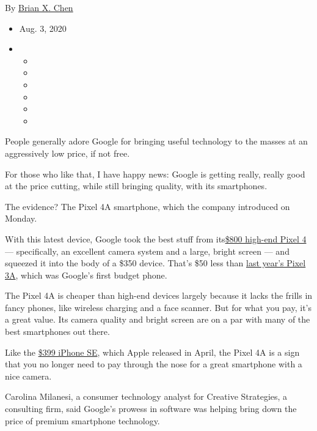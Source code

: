 By \href{https://www.nytimes.com/by/brian-x-chen}{Brian X. Chen}

\begin{itemize}
\item
  Aug. 3, 2020
\item
  \begin{itemize}
  \item
  \item
  \item
  \item
  \item
  \item
  \end{itemize}
\end{itemize}

People generally adore Google for bringing useful technology to the
masses at an aggressively low price, if not free.

For those who like that, I have happy news: Google is getting really,
really good at the price cutting, while still bringing quality, with its
smartphones.

The evidence? The Pixel 4A smartphone, which the company introduced on
Monday.

With this latest device, Google took the best stuff from
its\href{https://www.nytimes.com/2019/10/21/technology/personaltech/pixel-4-review.html}{\$800
high-end Pixel 4} --- specifically, an excellent camera system and a
large, bright screen --- and squeezed it into the body of a \$350
device. That's \$50 less than
\href{https://www.nytimes.com/2019/05/07/technology/personaltech/pixel-3a.html}{last
year's Pixel 3A}, which was Google's first budget phone.

The Pixel 4A is cheaper than high-end devices largely because it lacks
the frills in fancy phones, like wireless charging and a face scanner.
But for what you pay, it's a great value. Its camera quality and bright
screen are on a par with many of the best smartphones out there.

Like the
\href{https://www.nytimes.com/2020/05/06/technology/personaltech/apple-iphone-se-review.html}{\$399
iPhone SE}, which Apple released in April, the Pixel 4A is a sign that
you no longer need to pay through the nose for a great smartphone with a
nice camera.

Carolina Milanesi, a consumer technology analyst for Creative
Strategies, a consulting firm, said Google's prowess in software was
helping bring down the price of premium smartphone technology.

